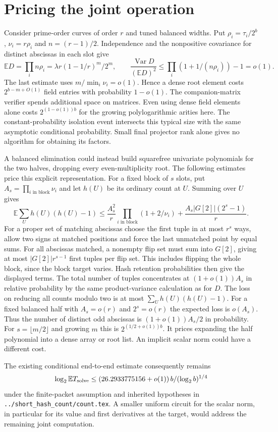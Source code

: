 \documentclass[11pt]{article}
\newcommand{\E}{\mathbb E}
\begin{document}
\section{Pricing the joint operation}
Consider prime-order curves of order $r$ and tuned balanced widths.
Put $\rho_i=\tau_i/2^b$, $\nu_i=r\rho_i$ and $n=(r-1)/2$.
Independence and the nonpositive covariance for distinct abscissas
in each slot give
\[
 \E D=\prod_i n\rho_i=\lambda r(1-1/r)^m/2^m,\qquad
 \frac{\operatorname{Var} D}{(\E D)^2}
     \le\prod_i(1+1/(n\rho_i))-1=o(1).
\]
The last estimate uses $m/\min_i\nu_i=o(1)$. Hence a dense root
element costs $2^{b-m+O(1)}$ field entries with probability $1-o(1)$.
The companion-matrix verifier spends additional space on matrices.
Even using dense field elements alone costs $2^{(1-o(1))b}$ for
the growing polylogarithmic arities here. The constant-probability
isolation event intersects this typical size with the same
asymptotic conditional probability. Small final projector rank
alone gives no algorithm for obtaining its factors.

A balanced elimination could instead build squarefree univariate
polynomials for the two halves, dropping every even-multiplicity
root. The following estimates price this explicit representation.
For a fixed block of $s$ slots, put $A_s=\prod_{i\text{ in block}}\nu_i$
and let $h(U)$ be its ordinary count at $U$. Summing over $U$ gives
\[
 \E\sum_U h(U)(h(U)-1)
 \le \frac{A_s^2}{r}\prod_{i\text{ in block}}(1+2/\nu_i)
       +\frac{A_s|G[2]|(2^s-1)}r .
\]
For a proper set of matching abscissas choose the first tuple in
at most $r^s$ ways, allow two signs at matched positions and force
the last unmatched point by equal sums. For all abscissas matched,
a nonempty flip set must sum into $G[2]$, giving at most
$|G[2]|r^{s-1}$ first tuples per flip set. This includes flipping
the whole block, since the block target varies. Hash retention
probabilities then give the displayed terms.
The total number of tuples concentrates at $(1+o(1))A_s$ in relative
probability by the same product-variance calculation as for $D$.
The loss on reducing all counts modulo two is at most
$\sum_U h(U)(h(U)-1)$. For a fixed balanced half with $A_s=o(r)$
and $2^s=o(r)$ the expected loss is $o(A_s)$. Thus the number
of distinct odd abscissas is $(1+o(1))A_s/2$ in probability.
For $s=\lfloor m/2\rfloor$ and growing $m$ this is
$2^{(1/2+o(1))b}$. It prices expanding the half polynomial into
a dense array or root list. An implicit scalar norm could have a
different cost.

The existing conditional end-to-end estimate consequently remains
\[
 \log_2\E T_{\rm solve}\le
 (26.2933775156+o(1))\,b/(\log_2 b)^{1/4}
\]
under the finite-packet assumption and inherited hypotheses in
\texttt{../short\_hash\_count/count.tex}. A smaller uniform circuit
for the scalar norm, in particular for its value and first derivatives
at the target, would address the remaining joint computation.
\end{document}
